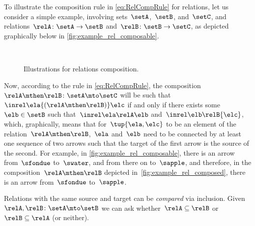 To illustrate the composition rule in \cref{eq:RelCompRule} for relations, let us consider a simple example, involving sets~$\setA$,~$\setB$, and~$\setC$, and relations~$\relA \colon \setA \to \setB$ and~$\relB \colon \setB \to \setC$, as depicted graphically below in \cref{fig:example_rel_composable}.
%
\begin{figure}[h!]
	\centering
	\\
	\caption{Illustrations for relations composition.}

\end{figure}
%
Now, according to the rule in \cref{eq:RelCompRule}, the composition~$\relA \mthen \relB \colon \setA \mto \setC$ will be such that~$\inrel \ela {(\relA \mthen \relB)} \elc$ if and only if there exists some~$\elb \in \setB$ such that~$\inrel \ela \relA \elb $ and~$\inrel \elb \relB{\elc}$, which, graphically, means that for~$\tup{\ela,\elc}$ to be an element of the relation~$\relA \mthen \relB$,~$\ela$ and~$\elb$ need to be connected by at least one sequence of two arrows such that the target of the first arrow is the source of the second.
For example, in \cref{fig:example_rel_composable}, there is an arrow from~$\sfondue$ to~$\swater$, and from there on to~$\sapple$, and therefore, in the composition~$\relA \mthen \relB$ depicted in~\cref{fig:example_rel_composed}, there is an arrow from~$\sfondue$ to~$\sapple$.

\begin{remark}
	Relations with the same source and target can be \emph{compared} via inclusion.
	Given~$\relA, \relB \colon \setA\mto \setB$  we can ask whether~$\relA\subseteq \relB$ or~$\relB\subseteq \relA$ (or neither).
\end{remark}
